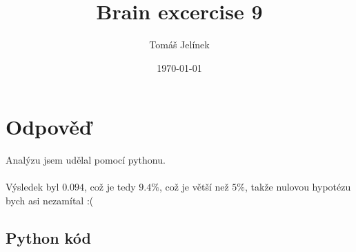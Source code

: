 \documentclass{article}
\title{Brain excercise 9}
\author{Tomáš Jelínek}
\date{\today}
\begin{document}
\maketitle

\section*{Odpověď}

Analýzu jsem udělal pomocí pythonu.
\\
\\
Výsledek byl $0.094$, což je tedy $9.4\%$, což je větší než $5\%$, takže nulovou hypotézu bych asi nezamítal :(

\subsection*{Python kód}


\end{document}
